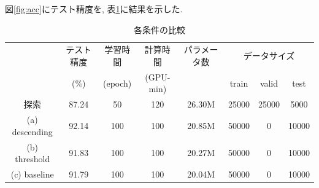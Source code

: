 \documentclass[twocolumn]{jarticle}     %
\begin{document}
図\ref{fig:acc}にテスト精度を, 表\ref{tab:acc}に結果を示した.

\begin{table}[tb]
  \begin{center}
    \caption{各条件の比較}
    \begin{tabular}{|c||c|c|c|c|c|c|c|} \hline
       & テスト精度  & 学習時間 & 計算時間 & パラメータ数 & \multicolumn{3}{c|}{データサイズ} \\
       & (\%)  & (epoch) & (GPU-min) & & train & valid & test \\ \hline \hline
      探索 & 87.24 & 50 & 120 & 26.30M & 25000 & 25000 & 5000 \\ \hline
      (a) descending & 92.14 & 100 & 100 & 20.85M & 50000 & 0 & 10000 \\ \hline
      (b) threshold & 91.83 & 100 & 100 & 20.27M & 50000 & 0 & 10000 \\ \hline
      (c) baseline & 91.79 & 100 & 100 & 20.04M & 50000 & 0 & 10000 \\ \hline
    \end{tabular}
    \label{tab:acc}
  \end{center}
\end{table}
\end{document}
